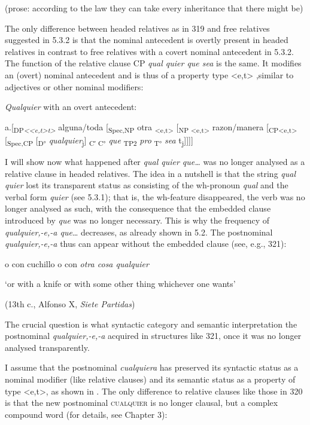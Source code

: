 \documentclass[output=paper]{langscibook}
\begin{document}
    (prose: according to the law they can take every inheritance that there might be)

The only difference between headed relatives as in 319 and free relatives suggested in 5.3.2 is that the nominal antecedent is overtly present in headed relatives in contrast to free relatives with a covert nominal antecedent in 5.3.2. The function of the relative clause CP \textit{qual quier que sea} is the same. It modifies an (overt) nominal antecedent and is thus of a property type <e,t> ,similar to adjectives or other nominal modifiers: 

  \textit{Qualquier} with an overt antecedent:

  a.[\textsubscript{DP}\textit{\textsubscript{<<e,t>t>}} alguna/toda [\textsubscript{Spec,NP} otra \textsubscript{<e,t>} [\textsubscript{NP <e,t>} razon/manera [\textsubscript{CP<e,t>} [\textsubscript{Spec,CP} [\textsubscript{D°} \textit{qualquier}\textsubscript{j}] \textsubscript{C′ C°} \textit{que} \textsubscript{TP2} \textit{pro\textsubscript{} }\textsubscript{T°} \textit{sea} t\textsubscript{j}]]]]


I will show now what happened after \textit{qual quier que…} was no longer analysed as a relative clause in headed relatives. The idea in a nutshell is that the string \textit{qual quier} lost its transparent status as consisting of the wh-pronoun \textit{qual} and the verbal form \textit{quier} (see 5.3.1); that is, the wh-feature disappeared, the verb was no longer analysed as such, with the consequence that the embedded clause introduced by \textit{que} was no longer necessary. This is why the frequency of \textit{qualquier,-e,-a que}… decreases, as already shown in 5.2. The postnominal \textit{qualquier,-e,-a} thus can appear without the embedded clause (see, e.g., 321):

    o con cuchillo o con \textit{otra cosa qualquier} 

    ‘or with a knife or with some other thing whichever one wants’ 

    (13th c., Alfonso X, \textit{Siete Partidas})

The crucial question is what syntactic category and semantic interpretation the postnominal \textit{qualquier,-e,-a} acquired in structures like 321, once it was no longer analysed transparently. 

I assume that the postnominal \textit{cualquiera} has preserved its syntactic status as a nominal modifier (like relative clauses) and its semantic status as a property of type <e,t>, as shown in . The only difference to relative clauses like those in 320 is that the new postnominal \textsc{cualquier} is no longer clausal, but a complex compound word (for details, see Chapter 3):
\end{document}
